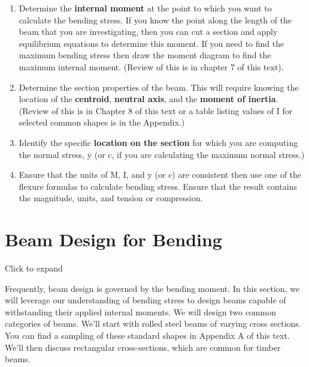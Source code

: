 \documentclass[
  letterpaper,
  DIV=11,
  numbers=noendperiod]{scrreprt}
\providecommand{\tightlist}{%
  \setlength{\itemsep}{0pt}\setlength{\parskip}{0pt}}\usepackage{longtable,booktabs,array}
\begin{document}
\begin{tcolorbox}[enhanced jigsaw, breakable, opacityback=0, toptitle=1mm, left=2mm, colback=white, opacitybacktitle=0.6, colframe=quarto-callout-warning-color-frame, titlerule=0mm, arc=.35mm, leftrule=.75mm, bottomtitle=1mm, colbacktitle=quarto-callout-warning-color!10!white, rightrule=.15mm, title=\textcolor{quarto-callout-warning-color}{\faExclamationTriangle}\hspace{0.5em}{Step-by-step: Calculating Bending Stress}, bottomrule=.15mm, toprule=.15mm, coltitle=black]

\begin{enumerate}
\def\labelenumi{\arabic{enumi}.}
\tightlist
\item
  Determine the \textbf{internal moment} at the point to which you want
  to calculate the bending stress. If you know the point along the
  length of the beam that you are investigating, then you can cut a
  section and apply equilibrium equations to determine this moment. If
  you need to find the maximum bending stress then draw the moment
  diagram to find the maximum internal moment. (Review of this is in
  chapter 7 of this text).
\item
  Determine the section properties of the beam. This will require
  knowing the location of the \textbf{centroid}, \textbf{neutral axis},
  and the \textbf{moment of inertia}. (Review of this is in Chapter 8 of
  this text or a table listing values of I for selected common shapes is
  in the Appendix.)
\item
  Identify the specific \textbf{location on the section} for which you
  are computing the normal stress, y (or c, if you are calculating the
  maximum normal stress.)
\item
  Ensure that the units of M, I, and y (or c) are consistent then use
  one of the flexure formulas to calculate bending stress. Ensure that
  the result contains the magnitude, units, and tension or compression.
\end{enumerate}

\end{tcolorbox}

\section{Beam Design for Bending}\label{sec-9.2}

Click to expand

Frequently, beam design is governed by the bending moment. In this
section, we will leverage our understanding of bending stress to design
beams capable of withstanding their applied internal moments. We will
design two common categories of beams. We'll start with rolled steel
beams of varying cross sections. You can find a sampling of these
standard shapes in Appendix A of this text. We'll then discuss
rectangular cross-sections, which are common for timber beams.
\end{document}

